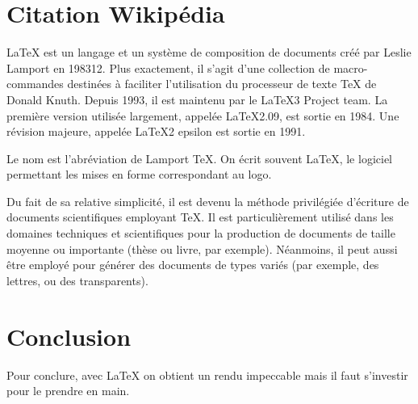 \documentclass[a4paper,11pt,final]{article}
\begin{document}
\cleardoublepage

\section{Citation Wikipédia}
\label{p2}


LaTeX est un langage et un système de composition de documents créé par Leslie Lamport en 198312. Plus exactement, il s'agit d'une collection de macro-commandes destinées à faciliter l'utilisation du \og processeur de texte \fg{} TeX de Donald Knuth. Depuis 1993, il est maintenu par le LaTeX3 Project team. La première version utilisée largement, appelée LaTeX2.09, est sortie en 1984. Une révision majeure, appelée LaTeX2 epsilon est sortie en 1991.

Le nom est l'abréviation de Lamport TeX. On écrit souvent \LaTeX, le logiciel permettant les mises en forme correspondant au logo.

Du fait de sa relative simplicité, il est devenu la méthode privilégiée d'écriture de documents scientifiques employant TeX. Il est particulièrement utilisé dans les domaines techniques et scientifiques pour la production de documents de taille moyenne ou importante (thèse ou livre, par exemple). Néanmoins, il peut aussi être employé pour générer des documents de types variés (par exemple, des lettres, ou des transparents).

\cleardoublepage

%

\section*{Conclusion}


Pour conclure, avec \LaTeX{} on obtient un rendu impeccable mais il faut s'investir pour le prendre en main.

\cleardoublepage

%
\end{document}
